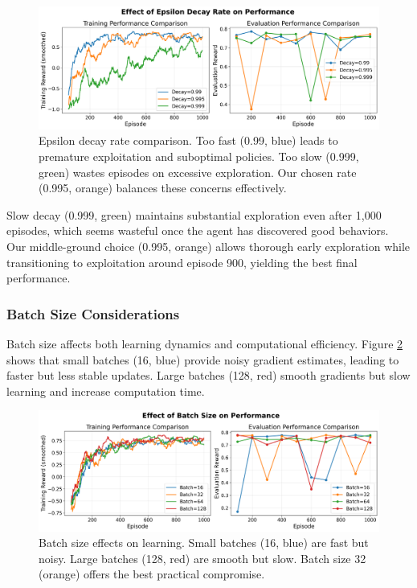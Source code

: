 \documentclass[conference]{IEEEtran}
\begin{document}
\begin{figure}[htbp]
\centerline{\includegraphics[width=\columnwidth]{images/experiment_epsilon.png}}
\caption{Epsilon decay rate comparison. Too fast (0.99, blue) leads to premature exploitation and suboptimal policies. Too slow (0.999, green) wastes episodes on excessive exploration. Our chosen rate (0.995, orange) balances these concerns effectively.}
\label{fig:epsilon}
\end{figure}

Slow decay (0.999, green) maintains substantial exploration even after 1,000 episodes, which seems wasteful once the agent has discovered good behaviors. Our middle-ground choice (0.995, orange) allows thorough early exploration while transitioning to exploitation around episode 900, yielding the best final performance.

\subsubsection{Batch Size Considerations}

Batch size affects both learning dynamics and computational efficiency. Figure \ref{fig:batchsize_plot} shows that small batches (16, blue) provide noisy gradient estimates, leading to faster but less stable updates. Large batches (128, red) smooth gradients but slow learning and increase computation time.

\begin{figure}[htbp]
\centerline{\includegraphics[width=\columnwidth]{images/experiment_batch_size.png}}
\caption{Batch size effects on learning. Small batches (16, blue) are fast but noisy. Large batches (128, red) are smooth but slow. Batch size 32 (orange) offers the best practical compromise.}
\label{fig:batchsize_plot}
\end{figure}
\end{document}
